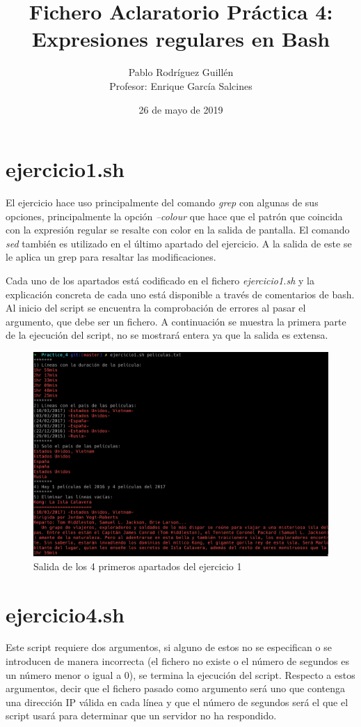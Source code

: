 \documentclass[11pt,a4paper]{article}
\author{Pablo Rodríguez Guillén \\ Profesor: Enrique García Salcines}
\title{\textbf{Fichero Aclaratorio Práctica 4: Expresiones regulares en Bash}}
\date{26 de mayo de 2019}
\begin{document}
\maketitle
\tableofcontents
\newpage

\section{ejercicio1.sh}
El ejercicio hace uso principalmente del comando \emph{grep} con algunas de sus opciones, principalmente la opción \emph{--colour} que hace que el patrón que coincida con la expresión regular se resalte con color en la salida de pantalla. El comando \emph{sed} también es utilizado en el último apartado del ejercicio. A la salida de este se le aplica un grep para resaltar las modificaciones.

Cada uno de los apartados está codificado en el fichero \emph{ejercicio1.sh} y la explicación concreta de cada uno está disponible a través de comentarios de bash. Al inicio del script se encuentra la comprobación de errores al pasar el argumento, que debe ser un fichero. A continuación se muestra la primera parte de la ejecución del script, no se mostrará entera ya que la salida es extensa.

\begin{figure}[ht]
	\centering
	\includegraphics[width=1\textwidth]{images/ejercicio1.png}
	\caption{Salida de los 4 primeros apartados del ejercicio 1}
\end{figure}

\section{ejercicio4.sh}
Este script requiere dos argumentos, si alguno de estos no se especifican o se introducen de manera incorrecta (el fichero no existe o el número de segundos es un número menor o igual a 0), se termina la ejecución del script. Respecto a estos argumentos, decir que el fichero pasado como argumento será uno que contenga una dirección IP válida en cada línea y que el número de segundos será el que el script usará para determinar que un servidor no ha respondido.
\end{document}
